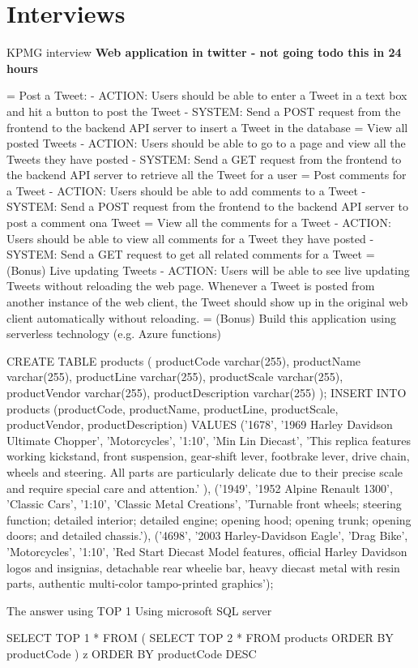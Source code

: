 
\section{Interviews}
KPMG interview
\textbf{Web application in twitter - not going todo this in 24 hours}

= Post a Tweet:
- ACTION: Users should be able to enter a Tweet in a text box and hit a button to post the Tweet
- SYSTEM: Send a POST request from the frontend to the backend API server to insert a Tweet in
the database
= View all posted Tweets
- ACTION: Users should be able to go to a page and view all the Tweets they have posted
- SYSTEM: Send a GET request from the frontend to the backend API server to retrieve all the Tweet
for a user
= Post comments for a Tweet
- ACTION: Users should be able to add comments to a Tweet
- SYSTEM: Send a POST request from the frontend to the backend API server to post a comment
ona Tweet
= View all the comments for a Tweet
- ACTION: Users should be able to view all comments for a Tweet they have posted
- SYSTEM: Send a GET request to get all related comments for a Tweet
= (Bonus) Live updating Tweets
- ACTION: Users will be able to see live updating Tweets without reloading the web page. Whenever
a Tweet is posted from another instance of the web client, the Tweet should show up in the original
web client automatically without reloading.
= (Bonus) Build this application using serverless technology (e.g. Azure functions)

\begin{listing}[caption={SQL Query for KPMG Interview}]
CREATE TABLE products (
productCode varchar(255),
productName varchar(255),
productLine varchar(255),
productScale varchar(255),
productVendor varchar(255),
productDescription varchar(255)
);
INSERT INTO products (productCode, productName, productLine, productScale,
productVendor, productDescription)
VALUES ('1678',
'1969 Harley Davidson Ultimate Chopper',
'Motorcycles',
'1:10',
'Min Lin Diecast',
'This replica features working kickstand, front suspension, gear-shift lever, footbrake lever, drive chain, wheels and steering. All parts are particularly delicate due to their precise scale and require special care and attention.'
),
('1949',
'1952 Alpine Renault 1300',
'Classic Cars',
'1:10',
'Classic Metal Creations',
'Turnable front wheels; steering function; detailed interior; detailed engine; opening hood; opening trunk; opening doors; and detailed chassis.'),
('4698',
'2003 Harley-Davidson Eagle',
'Drag Bike',
'Motorcycles',
'1:10',
'Red Start Diecast Model features, official Harley Davidson logos and insignias, detachable rear wheelie bar, heavy diecast metal with resin parts, authentic multi-color tampo-printed graphics');
\end{listing}

The answer using TOP 1 Using microsoft SQL server
\begin{listing}[caption={SQL Query for KPMG Interview -- Answer}]
SELECT TOP 1 *
FROM (
  SELECT TOP 2 * 
  FROM products
  ORDER BY productCode
) z
ORDER BY productCode DESC
\end{listing}